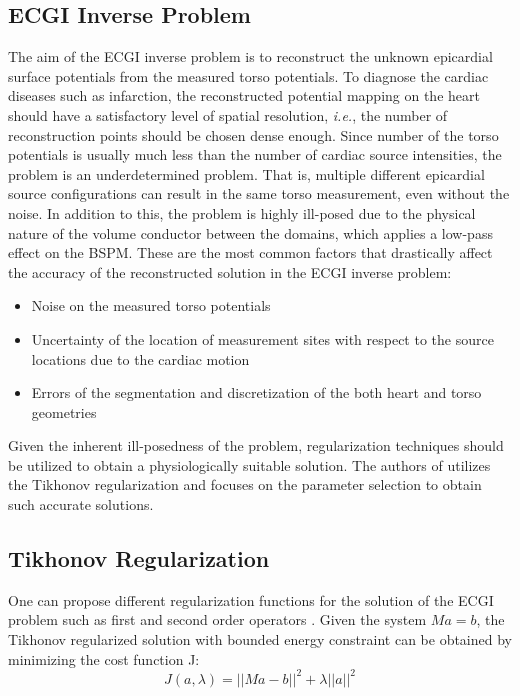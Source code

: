 \documentclass[draftcls, onecolumn, journal]{IEEEtran}
\begin{document}
\subsection{ECGI Inverse Problem}\label{subsec:ecginv}

The aim of the ECGI inverse problem is to reconstruct the unknown epicardial surface potentials from the measured torso potentials. To diagnose the cardiac diseases such as infarction, the reconstructed potential mapping on the heart should have a satisfactory level of spatial resolution, \textit{i.e.}, the number of reconstruction points should be chosen dense enough. Since number of the torso potentials is usually much less than the number of cardiac source intensities, the problem is an underdetermined problem. That is, multiple different epicardial source configurations can result in the same torso measurement, even without the noise. In addition to this, the problem is highly ill-posed due to the physical nature of the volume conductor between the domains, which applies a low-pass effect on the BSPM. These are the most common factors that drastically affect the accuracy of the reconstructed solution in the ECGI inverse problem:

\begin{itemize}
    \item Noise on the measured torso potentials
    \item Uncertainty of the location of measurement sites with respect to the source locations due to the cardiac motion 
    \item Errors of the segmentation and discretization of the both heart and torso geometries
\end{itemize}

Given the inherent ill-posedness of the problem, regularization techniques should be utilized to obtain a physiologically suitable solution. The authors of \cite*{chamorro2017improving} utilizes the Tikhonov regularization and focuses on the parameter selection to obtain such accurate solutions. 

\subsection{Tikhonov Regularization}\label{subsec:tikreg}

One can propose different regularization functions for the solution of the ECGI problem such as first and second order operators \cite*{milanivc2014assessment}. Given the system $Ma = b$, the Tikhonov regularized solution with bounded energy constraint can be obtained by minimizing the cost function J:
\begin{equation}
    J(a,\lambda) = ||Ma-b||^2 + \lambda ||a||^2
\end{equation}
\end{document}
